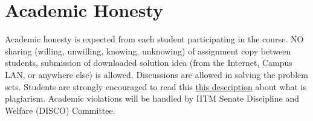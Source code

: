 \documentclass[10pt]{article}
\begin{document}
\section{Academic Honesty}

Academic honesty is expected from each student participating in the
course.  NO sharing (willing, unwilling, knowing, unknowing) of
assignment copy between students, submission of downloaded solution idea (from
the Internet, Campus LAN, or anywhere else) is allowed.  Discussions are allowed in solving the problem sets. Students are strongly encouraged to read this \href{https://cse.iith.ac.in/academics/plagiarism-policy.html}{this description} about what is plagiarism. Academic violations will be handled by IITM Senate Discipline and Welfare (DISCO) Committee.
\end{document}
